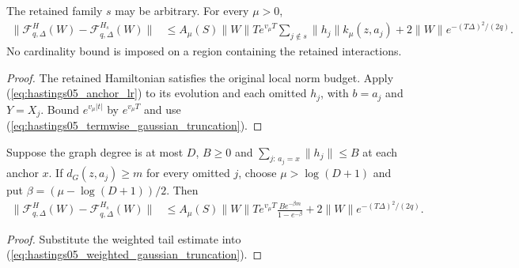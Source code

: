 \begin{lemma}
    \label{thm:hastings05_weighted_gaussian_truncation}
    \leanok
    The retained family $s$ may be arbitrary. For every $\mu>0$,
    \begin{align}
        \|\mathcal F_{q,\Delta}^{H}(W)-\mathcal F_{q,\Delta}^{H_s}(W)\|
         & \le A_\mu(S)\|W\|T e^{v_\mu T}
        \sum_{j\notin s}\|h_j\|k_\mu(z,a_j)
        +2\|W\|e^{-(T\Delta)^2/(2q)}.
        \label{eq:hastings05_weighted_gaussian_truncation}
    \end{align}
    No cardinality bound is imposed on a region containing the retained
    interactions.
\end{lemma}
\begin{proof}\leanok
    The retained Hamiltonian satisfies the original local norm budget.
    Apply (\ref{eq:hastings05_anchor_lr}) to its evolution and each omitted
    $h_j$, with $b=a_j$ and $Y=X_j$. Bound $e^{v_\mu|t|}$ by
    $e^{v_\mu T}$ and use
    (\ref{eq:hastings05_termwise_gaussian_truncation}).
\end{proof}

\begin{lemma}
    \label{thm:hastings05_degree_gaussian_truncation}
    \leanok
    Suppose the graph degree is at most $D$, $B\ge0$ and
    $\sum_{j:\,a_j=x}\|h_j\|\le B$ at each anchor $x$.
    If $d_G(z,a_j)\ge m$ for every omitted $j$, choose
    $\mu>\log(D+1)$ and put $\beta=(\mu-\log(D+1))/2$.
    Then
    \begin{align}
        \|\mathcal F_{q,\Delta}^{H}(W)-\mathcal F_{q,\Delta}^{H_s}(W)\|
         & \le A_\mu(S)\|W\|T e^{v_\mu T}
        \frac{B e^{-\beta m}}{1-e^{-\beta}}
        +2\|W\|e^{-(T\Delta)^2/(2q)}.
        \label{eq:hastings05_degree_gaussian_truncation}
    \end{align}
\end{lemma}
\begin{proof}\leanok
    Substitute the weighted tail estimate into
    (\ref{eq:hastings05_weighted_gaussian_truncation}).
\end{proof}

